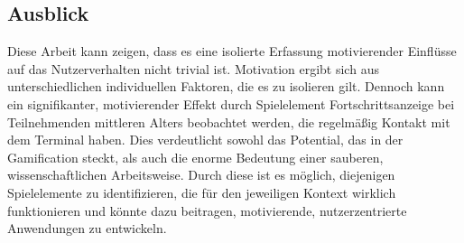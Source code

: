 \subsection{Ausblick}
Diese Arbeit kann zeigen, dass es eine isolierte Erfassung motivierender Einflüsse auf das Nutzerverhalten nicht trivial ist. Motivation ergibt sich aus unterschiedlichen individuellen Faktoren, die es zu isolieren gilt. Dennoch kann ein signifikanter, motivierender Effekt durch Spielelement Fortschrittsanzeige bei Teilnehmenden mittleren Alters beobachtet werden, die regelmäßig Kontakt mit dem Terminal haben. Dies verdeutlicht sowohl das Potential, das in der Gamification steckt, als auch die enorme Bedeutung einer sauberen, wissenschaftlichen Arbeitsweise. Durch diese ist es möglich, diejenigen Spielelemente zu identifizieren, die für den jeweiligen Kontext wirklich funktionieren und könnte dazu beitragen, motivierende, nutzerzentrierte Anwendungen zu entwickeln.